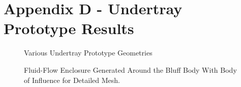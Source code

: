\newpage
\flushleft
\section*{Appendix D - Undertray Prototype Results} 

\begin{figure}[!htb]
    \centering
    \noindent{}
    \caption{Various Undertray Prototype Geometries}
    \label{fig:UTP_D}
\end{figure}

\begin{figure}[!htb]
    \centering
    \noindent{}
    \caption{Fluid-Flow Enclosure Generated Around the Bluff Body With Body of Influence for Detailed Mesh.}
    \label{fig:UTP_Fluid_flow}
\end{figure}



